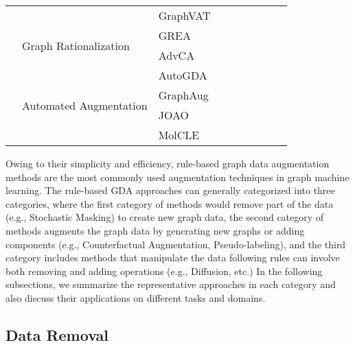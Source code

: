 \documentclass[11pt]{article}
\newcommand{\cmark}{\ding{51}}%
\begin{document}
\begin{table}[!th]
\begin{tabular}{l|l|l|ccc|ccc}
& & GraphVAT~\cite{feng2019graph} &\cmark  &  &  & & \cmark  &  \\
\cmidrule(lr){2-9}
& \multirow{2}{*}{Graph Rationalization}
& GREA~\cite{liu2022graph} &  & \cmark &  & \cmark & \cmark &  \\
&& AdvCA~\cite{sui2022adversarial} &  & \cmark &  & \cmark & \cmark &  \\
\cmidrule(lr){2-9}
& \multirow{4}{*}{Automated Augmentation}
& AutoGDA~\cite{zhao2022autogda} & \cmark &  &  & \cmark & \cmark &  \\
& & GraphAug~\cite{luo2022automated} &  & \cmark &  & \cmark & \cmark &  \\
& & JOAO~\cite{you2021graph} &  & \cmark &  & \cmark & \cmark &  \\
& & MolCLE~\cite{wang2021molecular} &  & \cmark &  & \cmark & \cmark &  \\
\bottomrule
\end{tabular}
\end{table}

Owing to their simplicity and efficiency, rule-based graph data augmentation methods are the most commonly used augmentation techniques in graph machine learning. The rule-based GDA approaches can generally categorized into three categories, where the first category of methods would remove part of the data (e.g., Stochastic Masking) to create new graph data, the second category of methods augments the graph data by generating new graphs or adding components (e.g., Counterfactual Augmentation, Pseudo-labeling),
and the third category includes methods that manipulate the data following rules can involve both removing and adding operations (e.g., Diffusion, etc.) In the following subsections, we summarize the representative approaches in each category and also discuss their applications on different tasks and domains.

\subsection{Data Removal}
\label{sec:dataremove}
\end{document}
